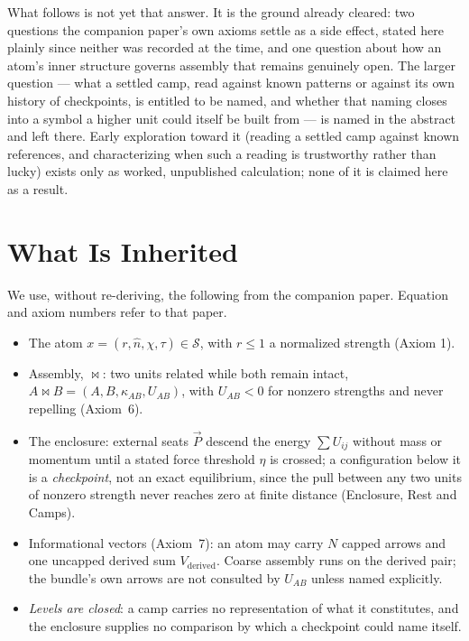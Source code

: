 \documentclass[12pt, a4paper]{article}
\begin{document}
What follows is not yet that answer. It is the ground already
cleared: two questions the companion paper's own axioms settle as a
side effect, stated here plainly since neither was recorded at the
time, and one question about how an atom's inner structure governs
assembly that remains genuinely open. The larger question --- what a
settled camp, read against known patterns or against its own
history of checkpoints, is entitled to be named, and whether that
naming closes into a symbol a higher unit could itself be built
from --- is named in the abstract and left there. Early exploration
toward it (reading a settled camp against known references, and
characterizing when such a reading is trustworthy rather than
lucky) exists only as worked, unpublished calculation; none of it is
claimed here as a result.

\section{What Is Inherited}
\label{sec:inherited}

We use, without re-deriving, the following from the companion
paper. Equation and axiom numbers refer to that paper.

\begin{itemize}
\item The atom $x=(r,\hat n,\chi,\tau)\in\mathcal{S}$, with $r\le 1$
      a normalized strength (Axiom 1).
\item Assembly, $\bowtie$: two units related while both remain
      intact, $A\bowtie B=(A,B,\kappa_{AB},U_{AB})$, with
      $U_{AB}<0$ for nonzero strengths and never repelling
      (Axiom~6).
\item The enclosure: external seats $\vec P$ descend the energy
      $\sum U_{ij}$ without mass or momentum until a stated force
      threshold $\eta$ is crossed; a configuration below it is a
      \emph{checkpoint}, not an exact equilibrium, since the pull
      between any two units of nonzero strength never reaches zero
      at finite distance (Enclosure, Rest and Camps).
\item Informational vectors (Axiom~7): an atom may carry $N$ capped
      arrows and one uncapped derived sum $V_{\mathrm{derived}}$.
      Coarse assembly runs on the derived pair; the bundle's own
      arrows are not consulted by $U_{AB}$ unless named explicitly.
\item \emph{Levels are closed}: a camp carries no representation of
      what it constitutes, and the enclosure supplies no comparison
      by which a checkpoint could name itself.
\end{itemize}
\end{document}
